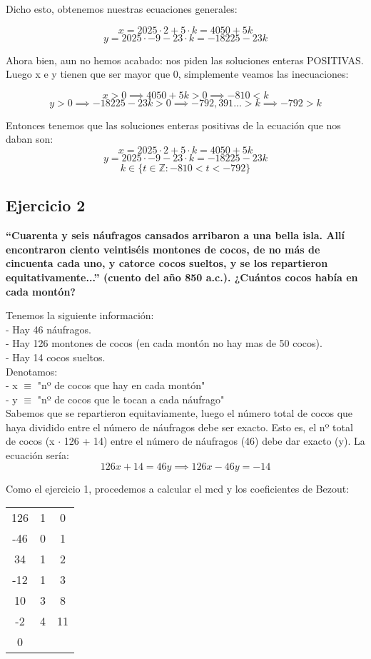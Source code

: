 \documentclass[11pt, a4paper, titlepage]{article}
\begin{document}
Dicho esto, obtenemos nuestras ecuaciones generales:

$$ x = 2025 \cdot 2 + 5 \cdot k = 4050 + 5k $$
$$ y = 2025 \cdot -9 - 23 \cdot k = -18225 - 23k $$

Ahora bien, aun no hemos acabado: nos piden las soluciones enteras POSITIVAS. Luego x e y tienen que ser mayor que 0, simplemente veamos las inecuaciones:

$$ x > 0 \implies 4050 + 5k > 0 \implies -810 < k$$
$$ y > 0 \implies -18225 - 23k > 0 \implies -792,391... > k \implies -792 > k $$

Entonces tenemos que las soluciones enteras positivas de la ecuación que nos daban son:
$$ x = 2025 \cdot 2 + 5 \cdot k = 4050 + 5k $$
$$ y = 2025 \cdot -9 - 23 \cdot k = -18225 - 23k $$
$$ k \in \{ t \in \mathbb{Z} : -810 < t < -792 \} $$

\subsection{\LARGE{Ejercicio 2}}

\textbf{“Cuarenta y seis náufragos cansados arribaron a una bella isla. Allí
encontraron ciento veintiséis montones de cocos, de no más de cincuenta cada uno,
y catorce cocos sueltos, y se los repartieron equitativamente...” (cuento del año
850 a.c.). ¿Cuántos cocos había en cada montón?}

Tenemos la siguiente información: \\
- Hay 46 náufragos. \\
- Hay 126 montones de cocos (en cada montón no hay mas de 50 cocos). \\
- Hay 14 cocos sueltos. \\

Denotamos: \\
- x $\equiv$ "nº de cocos que hay en cada montón" \\
- y $\equiv$ "nº de cocos que le tocan a cada náufrago" \\

Sabemos que se repartieron equitaviamente, luego el número total de cocos que haya dividido entre el número de náufragos debe ser exacto. Esto es, el nº total de cocos (x $\cdot$ 126 + 14) entre el número de náufragos (46) debe dar exacto (y). La ecuación sería:
$$ 126x + 14 = 46y \implies 126x - 46y = -14 $$

Como el ejercicio 1, procedemos a calcular el mcd y los coeficientes de Bezout:

\begin{center}
\begin{tabular}{c|cc}
126 & 1 & 0 \\
-46 & 0 & 1 \\
\hline
34 & 1 & 2 \\
\hline
-12 & 1 & 3 \\
\hline
10 & 3 & 8 \\
\hline
-2 & 4 & 11 \\
\hline
0
\end{tabular}
\end{center}
\end{document}
